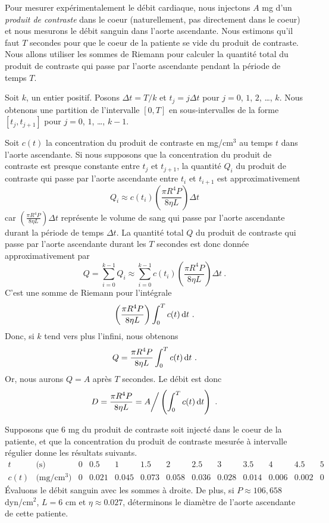 {\begin{egg}
Pour mesurer expérimentalement le débit cardiaque, nous injectons $A$ mg d'un
{\em produit de contraste} dans le coeur (naturellement, pas directement dans
le coeur) et nous mesurons le débit sanguin dans l'aorte ascendante.  Nous
estimons qu'il faut $T$ secondes pour que le coeur de la patiente se
vide du produit de contraste.  Nous allons utiliser les sommes de Riemann
pour calculer la quantité total du produit de contraste qui passe par
l'aorte ascendante pendant la période de temps $T$.

Soit $k$, un entier positif.  Posons $\Delta t = T/k$ et
$t_j = j \Delta t$ pour $j=0$, $1$, $2$, \ldots, $k$.  Nous obtenons une
partition de l'intervalle $[0,T]$ en sous-intervalles de la forme
$[t_j,t_{j+1}]$ pour $j=0$, $1$, \ldots, $k-1$.

Soit $c(t)$ la concentration du produit de contraste en mg/cm$^3$ au
temps $t$ dans l'aorte ascendante.  Si nous supposons que la
concentration du produit de contraste est presque constante entre
$t_j$ et $t_{j+1}$, la quantité $Q_i$ du produit de contraste qui passe par
l'aorte ascendante entre $t_i$ et $t_{i+1}$ est approximativement
\[
Q_i \approx c(t_i) \left( \frac{\pi R^4 P}{8\eta L}\right) \Delta t
\]
car $\displaystyle \left( \frac{\pi R^4 P}{8\eta L}\right) \Delta t$
représente le volume de sang qui passe par l'aorte ascendante durant la
période de temps $\Delta t$.  La quantité total $Q$ du produit de contraste
qui passe par l'aorte ascendante durant les $T$ secondes est donc donnée
approximativement par
\[
Q = \sum_{i=0}^{k-1} Q_i \approx
\sum_{i=0}^{k-1} c(t_i) \left( \frac{\pi R^4 P}{8\eta L}\right) \Delta t \ .
\]
C'est une somme de Riemann pour l'intégrale
\[
\left( \frac{\pi R^4 P}{8\eta L}\right) \int_0^T c(t) \,\mathrm{d}t \ .
\]
Donc, si $k$ tend vers plus l'infini, nous obtenons
\[
Q = \frac{\pi R^4 P}{8\eta L} \int_0^T c(t) \,\mathrm{d}t \ .
\]
Or, nous aurons $Q=A$ après $T$ secondes. Le débit est donc
\[
D = \frac{\pi R^4 P}{8\eta L} = A\bigg/\left(\int_0^T c(t) \dx{t}\right) \ .
\]

Supposons que $6$ mg du produit de contraste soit injecté dans le coeur de la
patiente, et que la concentration du produit de contraste mesurée à
intervalle régulier donne les résultats suivants.
\[
\begin{array}{cr|c|c|c|c|c|c|c|c|c|c|c}
t &\text{(s)} & 0 & 0.5 & 1 & 1.5 & 2 & 2.5 & 3 & 3.5 & 4 & 4.5 & 5 \\
\hline
c(t) & \text{(mg/cm$^3$)} & 0 & 0.021 & 0.045 & 0.073 & 0.058 & 0.036 &
0.028 & 0.014 & 0.006 & 0.002 & 0
\end{array}
\]
Évaluons le débit sanguin avec les sommes à droite.  De plus, si
$P \approx 106,658$ dyn/cm$^2$, $L=6$ cm et $\eta \approx 0.027$,
déterminons le diamètre de l'aorte ascendante de cette patiente.


\end{egg}}
